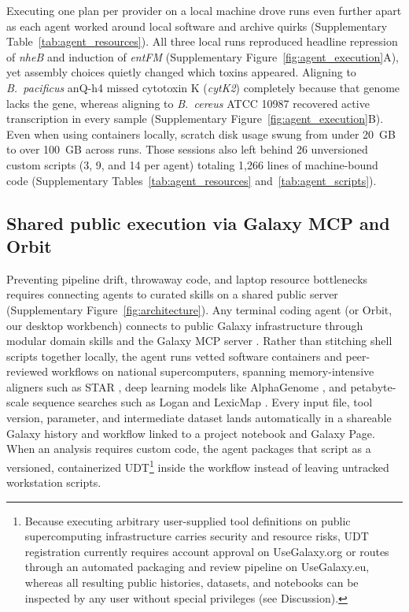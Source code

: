 \documentclass[11pt,letterpaper]{article}
\newcommand{\tool}[1]{\textsf{#1}}
\begin{document}
Executing one plan per provider on a local machine drove runs even further apart as each agent worked around local software and archive quirks (Supplementary Table~\ref{tab:agent_resources}). All three local runs reproduced headline repression of \textit{nheB} and induction of \textit{entFM} (Supplementary Figure~\ref{fig:agent_execution}A), yet assembly choices quietly changed which toxins appeared. Aligning to \textit{B.\ pacificus} anQ-h4 missed cytotoxin K (\textit{cytK2}) completely because that genome lacks the gene, whereas aligning to \textit{B.\ cereus} ATCC 10987 recovered active transcription in every sample (Supplementary Figure~\ref{fig:agent_execution}B). Even when using containers locally, scratch disk usage swung from under 20~GB to over 100~GB across runs. Those sessions also left behind 26 unversioned custom scripts (3, 9, and 14 per agent) totaling 1,266 lines of machine-bound code (Supplementary Tables~\ref{tab:agent_resources} and~\ref{tab:agent_scripts}).

\subsection{Shared public execution via Galaxy MCP and \tool{Orbit}}

Preventing pipeline drift, throwaway code, and laptop resource bottlenecks requires connecting agents to curated skills on a shared public server (Supplementary Figure~\ref{fig:architecture}). Any terminal coding agent (or \tool{Orbit}, our desktop workbench) connects to public Galaxy infrastructure \cite{galaxy2024} through modular domain skills and the Galaxy MCP server \cite{galaxymcp2026, galaxyskills2026}. Rather than stitching shell scripts together locally, the agent runs vetted software containers and peer-reviewed workflows on national supercomputers, spanning memory-intensive aligners such as \tool{STAR} \cite{dobin2013}, deep learning models like \tool{AlphaGenome} \cite{alphagenome2025}, and petabyte-scale sequence searches such as \tool{Logan} \cite{logan2024} and \tool{LexicMap} \cite{lexicmap2025}. Every input file, tool version, parameter, and intermediate dataset lands automatically in a shareable Galaxy history and workflow linked to a project notebook and Galaxy Page. When an analysis requires custom code, the agent packages that script as a versioned, containerized UDT\footnote{Because executing arbitrary user-supplied tool definitions on public supercomputing infrastructure carries security and resource risks, UDT registration currently requires account approval on UseGalaxy.org or routes through an automated packaging and review pipeline on UseGalaxy.eu, whereas all resulting public histories, datasets, and notebooks can be inspected by any user without special privileges (see Discussion).} \cite{galaxyudt2026} inside the workflow instead of leaving untracked workstation scripts.
\end{document}
